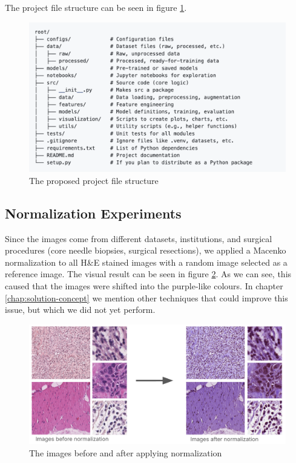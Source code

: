 The project file structure can be seen in figure \ref{fig:project-structure}.

\begin{figure}[H]
    \begin{centering}
    \includegraphics[width=14cm]{assets/images/project-structure.png}
    \par\end{centering}
    \caption{The proposed project file structure}
    \label{fig:project-structure}
\end{figure}

\subsection{Normalization Experiments}
Since the images come from different datasets, institutions, and surgical procedures (core needle biopsies, surgical resections), we applied a Macenko normalization to all H\&E stained images with a random image selected as a reference image. The visual result can be seen in figure \ref{fig:work-norm}. As we can see, this caused that the images were shifted into the purple-like colours. In chapter \ref{chap:solution-concept} we mention other techniques that could improve this issue, but which we did not yet perform.

\begin{figure}[H]
    \begin{centering}
    \includegraphics[width=14cm]{assets/images/work-normalization.png}
    \par\end{centering}
    \caption{The images before and after applying normalization}
    \label{fig:work-norm}
\end{figure}

